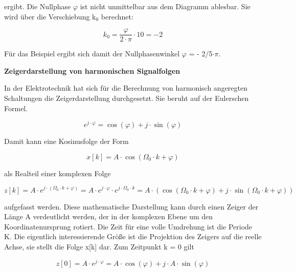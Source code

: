 \noindent ergibt. Die Nullphase $\varphi$ ist nicht unmittelbar aus dem Diagramm ablesbar. Sie wird \"{u}ber die Verschiebung k${}_{0}$ berechnet:

\begin{equation}\label{eq:threefiftyfour}
k_{0} =\frac{\varphi }{2\cdot \pi } \cdot 10=-2
\end{equation}

\noindent F\"{u}r das Beispiel ergibt sich damit der Nullphasenwinkel $\varphi$ = - 2/5$\cdot\pi$.\bigskip

{\selectfont
\noindent\textbf{Zeigerdarstellung von harmonischen Signalfolgen}} \smallskip

\noindent In der Elektrotechnik hat sich f\"{u}r die Berechnung von harmonisch angeregten Schaltungen die Zeigerdarstellung durchgesetzt. Sie beruht auf der Eulerschen Formel.

\begin{equation}\label{eq:threefiftyfive}
e^{j\cdot \varphi } =\cos (\varphi )+j\cdot \sin (\varphi )
\end{equation}

\noindent Damit kann eine Kosinusfolge der Form

\begin{equation}\label{eq:threefiftysix}
x\left[k\right]=A\cdot \cos \left(\Omega _{0} \cdot k+\varphi \right)
\end{equation}

\noindent als Realteil einer komplexen Folge

\begin{equation}\label{eq:threefiftyseven}
z\left[k\right]=A\cdot e^{j\cdot \left(\Omega _{0} \cdot k+\varphi \right)} =A\cdot e^{j\cdot \varphi } \cdot e^{j\cdot \Omega _{0} \cdot k} =A\cdot \left(\cos \left(\Omega _{0} \cdot k+\varphi \right)+j\cdot \sin \left(\Omega _{0} \cdot k+\varphi \right)\right)
\end{equation}

\noindent aufgefasst werden. Diese mathematische Darstellung kann durch einen Zeiger der L\"{a}nge A verdeutlicht werden, der in der komplexen Ebene um den Koordinatenursprung rotiert. Die Zeit f\"{u}r eine volle Umdrehung ist die Periode K. Die eigentlich interessierende Gr\"{o}{\ss}e ist die Projektion des Zeigers auf die reelle Achse, sie stellt die Folge x[k] dar. Zum Zeitpunkt k = 0 gilt

\begin{equation}\label{eq:threefiftyeight}
z\left[0\right]=A\cdot e^{j\cdot \varphi } =A\cdot \cos \left(\varphi \right)+j\cdot A\cdot \sin \left(\varphi \right)
\end{equation}

